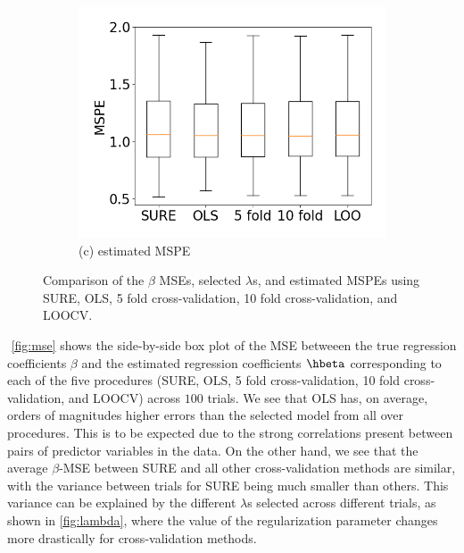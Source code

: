 \begin{figure}[t!]
\begin{subfigure}[b]{.32\columnwidth}
    \includegraphics[width=\columnwidth]{../fig/collinear_mspe.png}
    \caption{(c) estimated MSPE}
    \label{fig:mspe}
\end{subfigure}
\caption{Comparison of the $\beta$ MSEs, selected $\lambda$s, and estimated MSPEs using SURE, OLS, 5 fold cross-validation, 10 fold cross-validation, and LOOCV.}
\end{figure}

$ $\newline
\cref{fig:mse} shows the side-by-side box plot of the MSE betweeen the true regression coefficients $\beta$ and the estimated regression coefficients $\hbeta$ corresponding to each of the five procedures (SURE, OLS, 5 fold cross-validation, 10 fold cross-validation, and LOOCV) across $100$ trials. We see that OLS has, on average, orders of magnitudes higher errors than the selected model from all over procedures. This is to be expected due to the strong correlations present between pairs of predictor variables in the data. On the other hand, we see that the average $\beta$-MSE between SURE and all other cross-validation methods are similar, with the variance between trials for SURE being much smaller than others. This variance can be explained by the different $\lambda$s selected across different trials, as shown in \cref{fig:lambda}, where the value of the regularization parameter changes more drastically for cross-validation methods.

